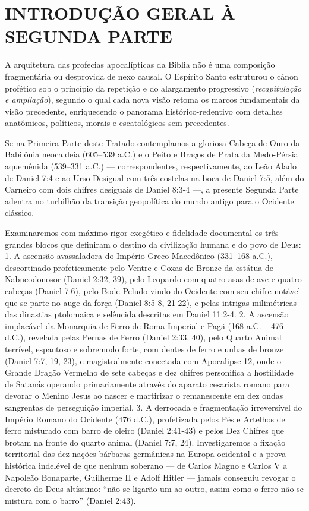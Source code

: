 \documentclass[11pt,a4paper,openany]{book}
\begin{document}
\section{INTRODUÇÃO GERAL À SEGUNDA PARTE}


A arquitetura das profecias apocalípticas da Bíblia não é uma composição fragmentária ou desprovida de nexo causal. O Espírito Santo estruturou o cânon profético sob o princípio da repetição e do alargamento progressivo (\textit{recapitulação e ampliação}), segundo o qual cada nova visão retoma os marcos fundamentais da visão precedente, enriquecendo o panorama histórico-redentivo com detalhes anatômicos, políticos, morais e escatológicos sem precedentes.

Se na Primeira Parte deste Tratado contemplamos a gloriosa Cabeça de Ouro da Babilônia neocaldeia (605–539 a.C.) e o Peito e Braços de Prata da Medo-Pérsia aquemênida (539–331 a.C.) — correspondentes, respectivamente, ao Leão Alado de Daniel 7:4 e ao Urso Desigual com três costelas na boca de Daniel 7:5, além do Carneiro com dois chifres desiguais de Daniel 8:3-4 —, a presente Segunda Parte adentra no turbilhão da transição geopolítica do mundo antigo para o Ocidente clássico.

Examinaremos com máximo rigor exegético e fidelidade documental os três grandes blocos que definiram o destino da civilização humana e do povo de Deus:
1. A ascensão avassaladora do Império Greco-Macedônico (331–168 a.C.), descortinado profeticamente pelo Ventre e Coxas de Bronze da estátua de Nabucodonosor (Daniel 2:32, 39), pelo Leopardo com quatro asas de ave e quatro cabeças (Daniel 7:6), pelo Bode Peludo vindo do Ocidente com seu chifre notável que se parte no auge da força (Daniel 8:5-8, 21-22), e pelas intrigas milimétricas das dinastias ptolomaica e selêucida descritas em Daniel 11:2-4.
2. A ascensão implacável da Monarquia de Ferro de Roma Imperial e Pagã (168 a.C. – 476 d.C.), revelada pelas Pernas de Ferro (Daniel 2:33, 40), pelo Quarto Animal terrível, espantoso e sobremodo forte, com dentes de ferro e unhas de bronze (Daniel 7:7, 19, 23), e magistralmente conectada com Apocalipse 12, onde o Grande Dragão Vermelho de sete cabeças e dez chifres personifica a hostilidade de Satanás operando primariamente através do aparato cesarista romano para devorar o Menino Jesus ao nascer e martirizar o remanescente em dez ondas sangrentas de perseguição imperial.
3. A derrocada e fragmentação irreversível do Império Romano do Ocidente (476 d.C.), profetizada pelos Pés e Artelhos de ferro misturado com barro de oleiro (Daniel 2:41-43) e pelos Dez Chifres que brotam na fronte do quarto animal (Daniel 7:7, 24). Investigaremos a fixação territorial das dez nações bárbaras germânicas na Europa ocidental e a prova histórica indelével de que nenhum soberano — de Carlos Magno e Carlos V a Napoleão Bonaparte, Guilherme II e Adolf Hitler — jamais conseguiu revogar o decreto do Deus altíssimo: ``não se ligarão um ao outro, assim como o ferro não se mistura com o barro'' (Daniel 2:43).
\end{document}
